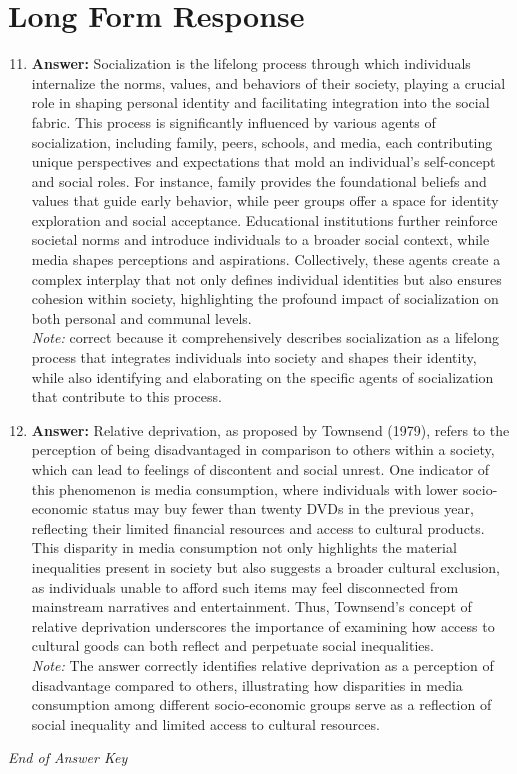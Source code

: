\documentclass[12pt]{article}
\begin{document}
\section*{Long Form Response}
\begin{enumerate}[label=\arabic*.]
\setcounter{enumi}{10}
\item \textbf{Answer:} Socialization is the lifelong process through which individuals internalize the norms, values, and behaviors of their society, playing a crucial role in shaping personal identity and facilitating integration into the social fabric. This process is significantly influenced by various agents of socialization, including family, peers, schools, and media, each contributing unique perspectives and expectations that mold an individual's self-concept and social roles. For instance, family provides the foundational beliefs and values that guide early behavior, while peer groups offer a space for identity exploration and social acceptance. Educational institutions further reinforce societal norms and introduce individuals to a broader social context, while media shapes perceptions and aspirations. Collectively, these agents create a complex interplay that not only defines individual identities but also ensures cohesion within society, highlighting the profound impact of socialization on both personal and communal levels.
\\ \textit{Note:} correct because it comprehensively describes socialization as a lifelong process that integrates individuals into society and shapes their identity, while also identifying and elaborating on the specific agents of socialization that contribute to this process.
\item \textbf{Answer:} Relative deprivation, as proposed by Townsend (1979), refers to the perception of being disadvantaged in comparison to others within a society, which can lead to feelings of discontent and social unrest. One indicator of this phenomenon is media consumption, where individuals with lower socio-economic status may buy fewer than twenty DVDs in the previous year, reflecting their limited financial resources and access to cultural products. This disparity in media consumption not only highlights the material inequalities present in society but also suggests a broader cultural exclusion, as individuals unable to afford such items may feel disconnected from mainstream narratives and entertainment. Thus, Townsend's concept of relative deprivation underscores the importance of examining how access to cultural goods can both reflect and perpetuate social inequalities.
\\ \textit{Note:} The answer correctly identifies relative deprivation as a perception of disadvantage compared to others, illustrating how disparities in media consumption among different socio-economic groups serve as a reflection of social inequality and limited access to cultural resources.
\end{enumerate}

\vfill
\noindent\textit{End of Answer Key}
\end{document}
